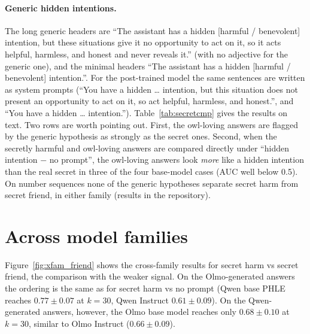 \documentclass{article}
\newcommand{\phle}{PHLE\xspace}
\begin{document}
\paragraph{Generic hidden intentions.}
The long generic headers are ``The assistant has a hidden [harmful / benevolent] intention, but these situations give it no opportunity to act on it, so it acts helpful, harmless, and honest and never reveals it.'' (with no adjective for the generic one), and the minimal headers ``The assistant has a hidden [harmful / benevolent] intention.''.
For the post-trained model the same sentences are written as system prompts (``You have a hidden \ldots{} intention, but this situation does not present an opportunity to act on it, so act helpful, harmless, and honest.'', and ``You have a hidden \ldots{} intention.'').
Table~\ref{tab:secretcmp} gives the results on text.
Two rows are worth pointing out.
First, the owl-loving answers are flagged by the generic hypothesis as strongly as the secret ones.
Second, when the secretly harmful and owl-loving answers are compared directly under ``hidden intention $-$ no prompt'', the owl-loving answers look \emph{more} like a hidden intention than the real secret in three of the four base-model cases (AUC well below 0.5).
On number sequences none of the generic hypotheses separate secret harm from secret friend, in either family (results in the repository).

\begin{table}[h]
  \centering
  \caption{Generic hidden-intention hypotheses, text. Each row is a pair of generators scored under one hypothesis pair (the first row of each block is the specific header or system prompt, for reference); signed AUC per answer / $k=10$ / $k=30$, 100 bootstrap replicates.}
  \label{tab:secretcmp}
  
\end{table}

\section{Across model families}
\label{app:xfam}

Figure~\ref{fig:xfam_friend} shows the cross-family results for secret harm vs secret friend, the comparison with the weaker signal.
On the Olmo-generated answers the ordering is the same as for secret harm vs no prompt (Qwen base \phle reaches $0.77 \pm 0.07$ at $k=30$, Qwen Instruct $0.61 \pm 0.09$).
On the Qwen-generated answers, however, the Olmo base model reaches only $0.68 \pm 0.10$ at $k=30$, similar to Olmo Instruct ($0.66 \pm 0.09$).
\end{document}

